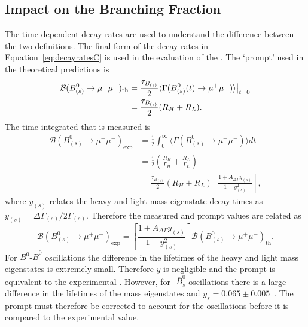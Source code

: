 \subsection{Impact on the Branching Fraction}
\label{sec:BFimpact}
The time-dependent decay rates are used to understand the difference between the two \BF definitions. The final form of the decay rates in Equation~\ref{eq:decayratesC} is used in the evaluation of the \BFs. The `prompt' \BF used in the theoretical predictions is
\begin{align}
\mathcal{B}(B^{0}_{(s)} \to \mu^{+} \mu^{-})_{\mathrm{th}} &= \frac{\tau_{B_{(s)}}}{2} \langle \Gamma(B^{0}_{(s)}(t) \to \mu^{+} \mu^{-}) \rangle \big{|}_{t=0}\\
&=\frac{\tau_{B_{(s)}}}{2} (R_{H} + R_{L}).
\end{align}
The time integrated \BF that is measured is
\begin{align}
  \mathcal{B}(B^{0}_{(s)} \to \mu^{+}\mu^{-})_{\mathrm{exp}} &= \frac{1}{2} \int^{\infty}_0 \langle \Gamma (B^{0}_{(s)} \to \mu^{+}\mu^{-}) \rangle  dt \nonumber \\
&= \frac{1}{2} \left( \frac{R_{H}}{\Gamma_{H}} + \frac{R_{L}}{\Gamma_{L}} \right) \nonumber \\
&= \frac{\tau_{B_{(s)}}}{2}(R_{H} + R_{L}) \left[ \frac{1 + A_{\Delta\Gamma}y_{(s)}}{1 - y_{(s)}^{2}} \right],
\end{align}
where $y_{(s)}$ relates the heavy and light mass eigenstate decay times as $y_{(s)} = \Delta \Gamma_{(s)} / 2\Gamma_{(s)}$. Therefore the measured and prompt \BF values are related as
\begin{equation}
  \mathcal{B}(B^0_{(s)} \to \mu^+\mu^-)_{\mathrm{exp}} = \left[ \frac{1 + A_{\Delta\Gamma}y_{(s)}}{1 - y_{(s)}^{2}} \right] \mathcal{B}(B^0_{(s)} \to \mu^+ \mu^-)_{\mathrm{th}}.
\end{equation}
For $B^0$-$\overline{B}^0$ oscillations the difference in the lifetimes of the heavy and light mass eigenstates is extremely small. Therefore $y$ is negligible and the prompt \BF is equivalent to the experimental \BF. However, for \bs-$\overline{B}^0_s$ oscillations there is a large difference in the lifetimes of the mass eigenstates and $y_s =0.065 \pm 0.005$~\cite{Olive:2016xmw}. The prompt \BF must therefore be corrected to account for the oscillations before it is compared to the experimental value.
